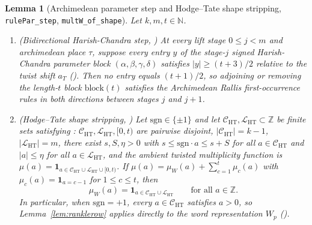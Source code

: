 \documentclass[11pt]{amsart}
\newcommand{\Z}{\mathbb{Z}}
\newcommand{\N}{\mathbb{N}}
\theoremstyle{plain}
\newtheorem{lemma}[theorem]{Lemma}
\theoremstyle{definition}
\numberwithin{equation}{section}
\begin{document}
\begin{lemma}[Archimedean parameter step and Hodge--Tate shape stripping, \texttt{rulePar\_step}, \texttt{multW\_of\_shape}]\label{lem:steprule}
Let $k,m,t\in\N$.
\begin{enumerate}[label=(\roman*)]
\item \textup{(Bidirectional Harish-Chandra step, )} At every lift stage
  $0\le j<m$ and archimedean place $\tau$, suppose every entry $y$ of the stage-$j$ signed
  Harish-Chandra parameter block $(\alpha,\beta,\gamma,\delta)$ satisfies $|y|\ge(t+3)/2$ relative
  to the twist shift $a_T$ (). Then no entry equals $(t+1)/2$, so adjoining or
  removing the length-$t$ block $\mathrm{block}(t)$ satisfies the Archimedean Rallis first-occurrence
  rules in both directions between stages $j$ and $j+1$.
\item \textup{(Hodge--Tate shape stripping, )} Let $\mathrm{sgn}\in\{\pm1\}$
  and let $\mathcal C_{\mathrm{HT}},\mathcal L_{\mathrm{HT}}\subset\Z$ be finite sets satisfying
  : $\mathcal C_{\mathrm{HT}},\mathcal L_{\mathrm{HT}},[0,t)$ are pairwise
  disjoint, $|\mathcal C_{\mathrm{HT}}|=k-1$, $|\mathcal L_{\mathrm{HT}}|=m$, there exist
  $s,S,\eta>0$ with $s\le\mathrm{sgn}\cdot a\le s+S$ for all $a\in\mathcal C_{\mathrm{HT}}$ and
  $|a|\le\eta$ for all $a\in\mathcal L_{\mathrm{HT}}$, and the ambient twisted multiplicity function
  is $\mu(a)=\mathbf{1}_{a\in\mathcal C_{\mathrm{HT}}\cup\mathcal L_{\mathrm{HT}}\cup[0,t)}$. If
  $\mu(a)=\mu_W(a)+\sum_{c=1}^t\mu_c(a)$ with $\mu_c(a)=\mathbf{1}_{a=c-1}$ for $1\le c\le t$, then
  \[
  \mu_W(a)=\mathbf{1}_{a\in\mathcal C_{\mathrm{HT}}\cup\mathcal L_{\mathrm{HT}}}\qquad
  \text{for all }a\in\Z.
  \]
  In particular, when $\mathrm{sgn}=+1$, every $a\in\mathcal C_{\mathrm{HT}}$ satisfies $a>0$, so
  Lemma~\ref{lem:ranklerow} applies directly to the word representation $W_p$
  ().
\end{enumerate}
\end{lemma}
\end{document}
